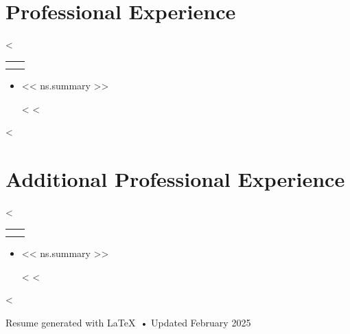 \documentclass[letterpaper,11pt]{article}
\makeatletter
\newcommand{\sectionSpacing}{\vspace{5pt}}
\newcommand{\medbold}[1]{{\fontseries{100}\selectfont #1}} %
\newcommand{\listItem}[2]{\item{#2 {#1}}}
\newcommand{\listEnd}{\end{itemize}}
\newcommand{\actionListStart}{\begin{itemize}[leftmargin=0.1in, label={}]}
\newcommand{\actionListItem}[1]{\listItem{#1}{\ding{43}}}
\newcommand{\positiveBolding}[1]{\medbold{\color{mediumgray}{#1}}}
\newcommand{\resumeSubheading}[4]{
  \begin{tabular*}{\linewidth}[t]{l@{\extracolsep{\fill}}r}
    \textbf{\color{mediumgray}{#1}} & \color{mediumgray}{#2} \\
    \color{mediumgray}{#3} & \color{mediumgray}{#4} \\
  \end{tabular*}
  \vspace{-8pt}
}
\makeatother
\begin{document}
\begin{paracol}{2}
\section{Professional Experience}

<%
\resumeSubheading
  {<< c.company | latex_escape >>}
  {<< c.start_date >> -- << c.end_date >>}
  {<< c.title | latex_escape >>}
  {<< c.location | latex_escape >>}

  \actionListStart

  <%
    <%

      <%
      <%
      <%
          <%
          <%
      <%

      \actionListItem{<< ns.summary >>}

    <%
  <%
  \listEnd
  \sectionSpacing
<%
\sectionSpacing


\section{Additional Professional Experience}

<%
\resumeSubheading
  {<< c.company | latex_escape >>}
  {<< c.start_date >> -- << c.end_date >>}
  {<< c.title | latex_escape >>}
  {<< c.location >>}

  \actionListStart

  <%
    <%

      <%
      <%
      <%
          <%
          <%
      <%

      \actionListItem{<< ns.summary >>}

    <%
  <%
  \listEnd
  \sectionSpacing
<%
\sectionSpacing


\end{paracol}


\vfill
\begin{center}
    \scriptsize\color{lightgray}
    Resume generated with \LaTeX\ • Updated February 2025
\end{center}
\end{document}
